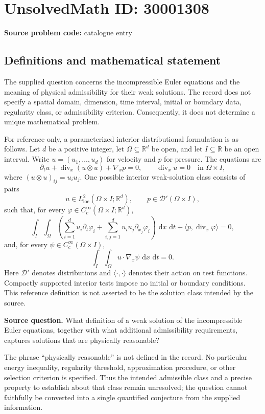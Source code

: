 \documentclass[11pt]{article}
\newcommand{\R}{\mathbb{R}}
\newcommand{\dd}{\,\mathrm{d}}
\begin{document}
\section*{UnsolvedMath ID: 30001308}
\textbf{Source problem code:} catalogue entry
\subsection{Definitions and mathematical statement}
The supplied question concerns the incompressible Euler equations and the meaning of physical admissibility for their weak solutions. The record does not specify a spatial domain, dimension, time interval, initial or boundary data, regularity class, or admissibility criterion. Consequently, it does not determine a unique mathematical problem.

For reference only, a parameterized interior distributional formulation is as follows. Let \(d\) be a positive integer, let \(\Omega\subseteq\R^d\) be open, and let \(I\subseteq\R\) be an open interval. Write \(u=(u_1,\ldots,u_d)\) for velocity and \(p\) for pressure. The equations are
\[
\partial_tu+\operatorname{div}_x(u\otimes u)+\nabla_xp=0,
\qquad \operatorname{div}_xu=0
\quad\text{in }\Omega\times I,
\]
where \((u\otimes u)_{ij}=u_i u_j\). One possible interior weak-solution class consists of pairs
\[
u\in L^2_{\mathrm{loc}}(\Omega\times I;\R^d),
\qquad p\in\mathcal D'(\Omega\times I),
\]
such that, for every \(\varphi\in C_c^\infty(\Omega\times I;\R^d)\),
\[
\int_I\!\int_\Omega
\left(\sum_{i=1}^d u_i\partial_t\varphi_i
+\sum_{i,j=1}^d u_i u_j\partial_{x_j}\varphi_i\right)\,\dd x\,\dd t
+\langle p,\operatorname{div}_x\varphi\rangle=0,
\]
and, for every \(\psi\in C_c^\infty(\Omega\times I)\),
\[
\int_I\!\int_\Omega u\cdot\nabla_x\psi\,\dd x\,\dd t=0.
\]
Here \(\mathcal D'\) denotes distributions and \(\langle\cdot,\cdot\rangle\) denotes their action on test functions. Compactly supported interior tests impose no initial or boundary conditions. This reference definition is not asserted to be the solution class intended by the source.

\textbf{Source question.} What definition of a weak solution of the incompressible Euler equations, together with what additional admissibility requirements, captures solutions that are physically reasonable?

The phrase ``physically reasonable'' is not defined in the record. No particular energy inequality, regularity threshold, approximation procedure, or other selection criterion is specified. Thus the intended admissible class and a precise property to establish about that class remain unresolved; the question cannot faithfully be converted into a single quantified conjecture from the supplied information.
\end{document}
